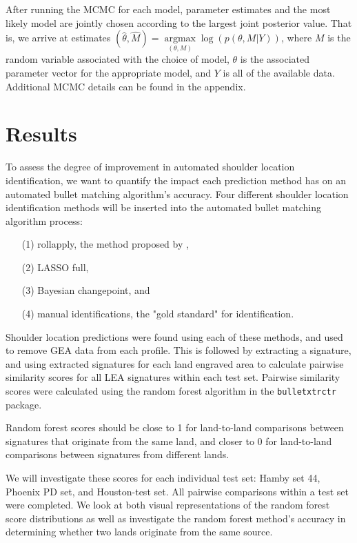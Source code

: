 \documentclass[12pt]{article}
\begin{document}
After running the MCMC for each model, parameter estimates and the most
likely model are jointly chosen according to the largest joint posterior
value. That is, we arrive at estimates
\((\hat{\theta}, \hat{M}) = \underset{(\theta, M)}{\operatorname{argmax}}{\log(p(\theta, M | Y))}\),
where \(M\) is the random variable associated with the choice of model,
\(\theta\) is the associated parameter vector for the appropriate model,
and \(Y\) is all of the available data. Additional MCMC details can be
found in the appendix.

\section{Results}

To assess the degree of improvement in automated shoulder location
identification, we want to quantify the impact each prediction method
has on an automated bullet matching algorithm's accuracy. Four different
shoulder location identification methods will be inserted into the
automated bullet matching algorithm process:

\begin{itemize}
\item[(1)] rollapply, the method proposed by \cite{Hare1}, 
\item[(2)] LASSO full,
\item[(3)] Bayesian changepoint, and
\item[(4)] manual identifications, the "gold standard" for identification.  
\end{itemize}

Shoulder location predictions were found using each of these methods,
and used to remove GEA data from each profile. This is followed by
extracting a signature, and using extracted signatures for each land
engraved area to calculate pairwise similarity scores for all LEA
signatures within each test set. Pairwise similarity scores were
calculated using the random forest algorithm in the
\texttt{bulletxtrctr} package.

Random forest scores should be close to 1 for land-to-land comparisons
between signatures that originate from the same land, and closer to 0
for land-to-land comparisons between signatures from different lands.

We will investigate these scores for each individual test set: Hamby set
44, Phoenix PD set, and Houston-test set. All pairwise comparisons
within a test set were completed. We look at both visual representations
of the random forest score distributions as well as investigate the
random forest method's accuracy in determining whether two lands
originate from the same source.
\end{document}
